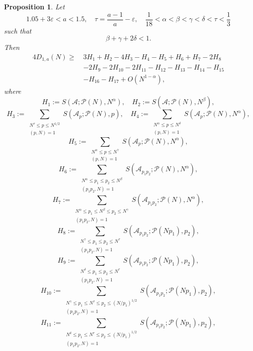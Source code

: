 \documentclass[10pt,a4paper]{amsart}
\newtheorem{proposition}{Proposition}
\def\geq{\geqslant}
\def\le{\leqslant}
\def\leq{\leqslant}
\begin{document}
\begin{proposition}\label{Goldbachweight2}
Let 
$$
1.05+3\varepsilon<a<1.5,\quad \tau=\dfrac{a-1}{a}-\varepsilon, \quad \dfrac{1}{18}<\alpha<\beta<\gamma<\delta< \tau<\dfrac{1}{3} 
$$ 
such that
\begin{equation}\label{Con/bcd}
\beta+\gamma+2\delta< 1. 
\end{equation}
Then 
\begin{equation}\label{Goldbachsmallw4}
		\begin{split}
		4D_{1,a}(N) \geq\ &3H_1 + H_2 -4H_3- H_4- H_5 + H_6 + H_7- 2H_8 \\
		& - 2H_9 -2H_{10}- 2H_{11} - H_{12} - H_{13}-H_{14}-H_{15} \\ 
		& -H_{16}-H_{17} + O(N^{1 - \alpha}),
		\end{split}
		\end{equation}
		where
\[
H_1 := S(\mathscr{A}; \mathscr{P}(N), N^{\alpha}),\quad H_2 := S(\mathscr{A}; \mathscr{P}(N), N^{\beta}),
\]
\[
H_3 :=\sum\limits_{\substack{N^\tau\le p\le N^{1/2} \\(p, N)=1}}S(\mathscr{A}_p ; \mathscr{P}(N), p),
\quad 
H_4 := \sum_{\substack{N^{\alpha} \leq p \le N^{\delta} \\ (p, N) = 1}} S(\mathscr{A}_p; \mathscr{P}(N), N^{\alpha}), 
\]
\[
H_5 := \sum_{\substack{N^{\alpha} \leq p \le N^{\gamma} \\ (p, N) = 1}} S(\mathscr{A}_p; \mathscr{P}(N), N^{\alpha}),
\]
\[ 
H_6 := \sum_{\substack{N^{\alpha} \leq p_1 \le p_2 \le N^{\beta} \\ (p_1 p_2, N) = 1}} S(\mathscr{A}_{p_1 p_2}; \mathscr{P}(N), N^{\alpha}),
\]
\[ 
H_7 := \sum_{\substack{N^{\alpha} \leq p_1 \le N^{\beta} \le p_2 \le N^{\gamma} \\ (p_1 p_2, N) = 1}} S(\mathscr{A}_{p_1 p_2}; \mathscr{P}(N), N^{\alpha}),
\] 
\[
H_8 := \sum_{\substack{N^{\gamma} \leq p_1 \le p_2 \le N^{\tau} \\ (p_1 p_2, N) = 1}} S(\mathscr{A}_{p_1 p_2}; \mathscr{P}(N p_1), p_2),
\]
\[ 
H_{9} := \sum_{\substack{N^{\delta} \leq p_1 \le p_2 \le N^{\tau} \\ (p_1 p_2, N) = 1}} S(\mathscr{A}_{p_1 p_2}; \mathscr{P}(N p_1), p_2),
\]
\[
H_{10} := \sum_{\substack{N^{\gamma} \leq p_1 \le N^{\tau}\le p_2 \le (N/p_1)^{1/2} \\ (p_1 p_2, N) = 1}} S(\mathscr{A}_{p_1 p_2}; \mathscr{P}(N p_1), p_2),
\]
\[
H_{11} := \sum_{\substack{N^{\delta} \leq p_1 \le N^{\tau}\le p_2 \le (N/p_1)^{1/2} \\ (p_1 p_2, N) = 1}} S(\mathscr{A}_{p_1 p_2}; \mathscr{P}(N p_1), p_2),
\]
\end{proposition}
\end{document}
